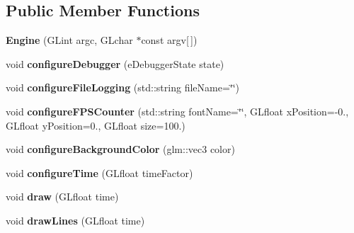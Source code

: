 \subsection*{Public Member Functions}
\begin{DoxyCompactItemize}
\item 
\hypertarget{classfillwave_1_1Engine_a6348c216dda393c0ec969a1871f286b0}{}{\bfseries Engine} (G\+Lint argc, G\+Lchar $\ast$const argv\mbox{[}$\,$\mbox{]})\label{classfillwave_1_1Engine_a6348c216dda393c0ec969a1871f286b0}

\item 
\hypertarget{classfillwave_1_1Engine_a8ab70999c6424f4aff5eea39a23793fb}{}void {\bfseries configure\+Debugger} (e\+Debugger\+State state)\label{classfillwave_1_1Engine_a8ab70999c6424f4aff5eea39a23793fb}

\item 
\hypertarget{classfillwave_1_1Engine_a79b8431174a0e21ee33550bb17435572}{}void {\bfseries configure\+File\+Logging} (std\+::string file\+Name=\char`\"{}\char`\"{})\label{classfillwave_1_1Engine_a79b8431174a0e21ee33550bb17435572}

\item 
\hypertarget{classfillwave_1_1Engine_afeda6ab5368be17d98e6c1a703968ddd}{}void {\bfseries configure\+F\+P\+S\+Counter} (std\+::string font\+Name=\char`\"{}\char`\"{}, G\+Lfloat x\+Position=-\/0., G\+Lfloat y\+Position=0., G\+Lfloat size=100.)\label{classfillwave_1_1Engine_afeda6ab5368be17d98e6c1a703968ddd}

\item 
\hypertarget{classfillwave_1_1Engine_a317929adad6bac338fe9de406256aafc}{}void {\bfseries configure\+Background\+Color} (glm\+::vec3 color)\label{classfillwave_1_1Engine_a317929adad6bac338fe9de406256aafc}

\item 
\hypertarget{classfillwave_1_1Engine_afca8e958d13dc33cbe336db17bd2f1c7}{}void {\bfseries configure\+Time} (G\+Lfloat time\+Factor)\label{classfillwave_1_1Engine_afca8e958d13dc33cbe336db17bd2f1c7}

\item 
\hypertarget{classfillwave_1_1Engine_ae6b333344d6322eb369f6d53fe24d292}{}void {\bfseries draw} (G\+Lfloat time)\label{classfillwave_1_1Engine_ae6b333344d6322eb369f6d53fe24d292}

\item 
\hypertarget{classfillwave_1_1Engine_af9320dfea90a32c439e67ddb08262b15}{}void {\bfseries draw\+Lines} (G\+Lfloat time)\label{classfillwave_1_1Engine_af9320dfea90a32c439e67ddb08262b15}


\end{DoxyCompactItemize}
